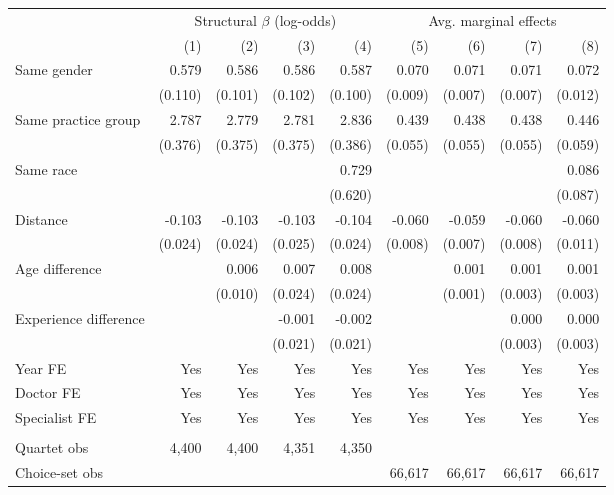 
\begin{tabular}{lrrrrrrrr}
\toprule
\multicolumn{1}{c}{ } & \multicolumn{4}{c}{Structural $\beta$ (log-odds)} & \multicolumn{4}{c}{Avg. marginal effects} \\
\cmidrule(l{3pt}r{3pt}){2-5} \cmidrule(l{3pt}r{3pt}){6-9}
 & (1) & (2) & (3) & (4) & (5) & (6) & (7) & (8)\\
\midrule
Same gender & 0.579 & 0.586 & 0.586 & 0.587 & 0.070 & 0.071 & 0.071 & 0.072\\
 & (0.110) & (0.101) & (0.102) & (0.100) & (0.009) & (0.007) & (0.007) & (0.012)\\
Same practice group & 2.787 & 2.779 & 2.781 & 2.836 & 0.439 & 0.438 & 0.438 & 0.446\\
 & (0.376) & (0.375) & (0.375) & (0.386) & (0.055) & (0.055) & (0.055) & (0.059)\\
Same race &  &  &  & 0.729 &  &  &  & 0.086\\
 &  &  &  & (0.620) &  &  &  & (0.087)\\
Distance & -0.103 & -0.103 & -0.103 & -0.104 & -0.060 & -0.059 & -0.060 & -0.060\\
 & (0.024) & (0.024) & (0.025) & (0.024) & (0.008) & (0.007) & (0.008) & (0.011)\\
Age difference &  & 0.006 & 0.007 & 0.008 &  & 0.001 & 0.001 & 0.001\\
 &  & (0.010) & (0.024) & (0.024) &  & (0.001) & (0.003) & (0.003)\\
Experience difference &  &  & -0.001 & -0.002 &  &  & 0.000 & 0.000\\
 &  &  & (0.021) & (0.021) &  &  & (0.003) & (0.003)\\
\midrule
Year FE & Yes & Yes & Yes & Yes & Yes & Yes & Yes & Yes\\
Doctor FE & Yes & Yes & Yes & Yes & Yes & Yes & Yes & Yes\\
Specialist FE & Yes & Yes & Yes & Yes & Yes & Yes & Yes & Yes\\
\midrule\\
Quartet obs & 4,400 & 4,400 & 4,351 & 4,350 &  &  &  & \\
Choice-set obs &  &  &  &  & 66,617 & 66,617 & 66,617 & 66,617\\
\bottomrule
\end{tabular}
